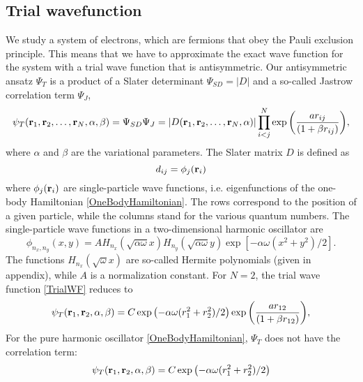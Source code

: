 \documentclass[english, a4paper]{article}
\begin{document}
\subsection{Trial wavefunction}
We study a system of electrons, which are fermions that obey the Pauli exclusion principle.
This means that we have to approximate the exact wave function for the system with a trial
wave function that is antisymmetric. Our antisymmetric ansatz $\Psi_T$ is a product of a 
Slater determinant $\Psi_{SD} = |D|$ and a so-called Jastrow correlation term $\Psi_J$,
\begin{equation}
   \psi_{T}({\bf r}_1,{\bf r}_2,\dots, {\bf r}_N, \alpha, \beta) = \Psi_{SD}\Psi_J = 
   |D({\bf r}_1,{\bf r}_2,\dots, {\bf r}_N, \alpha)|
   \prod_{i<j}^{N}\exp{\left(\frac{a r_{ij}}{(1+\beta r_{ij})}\right)}, 
   \label{TrialWF}
\end{equation}
where $\alpha$ and $\beta$ are the variational parameters.
The Slater matrix $D$ is defined as
\begin{equation}
 d_{ij} = \phi_j({\bf r}_i)
 \label{slaterMatrix}
\end{equation}
where $\phi_j({\bf r}_i)$ are single-particle wave functions, i.e. eigenfunctions of the one-body 
Hamiltonian \eqref{OneBodyHamiltonian}. The rows correspond to the position of a given particle, 
while the columns stand for the various quantum numbers.
The single-particle wave functions in a two-dimensional harmonic oscillator are
\begin{equation}
 \phi_{n_x,n_y}(x,y) = A H_{n_x}(\sqrt{\alpha\omega}x)H_{n_y}(\sqrt{\alpha\omega}y)\exp{[-\alpha\omega(x^2+y^2)/2]}.
\end{equation}
The functions $H_{n_x}(\sqrt{\omega}x)$ are so-called Hermite polynomials (given in appendix), while
$A$ is a normalization constant. 
For $N=2$, the trial wave function \eqref{TrialWF} reduces to
\begin{equation}
   \psi_{T}({\bf r}_1,{\bf r}_2, \alpha, \beta) = 
   C\exp{\left(-\alpha\omega(r_1^2+r_2^2)/2\right)}
   \exp{\left(\frac{ar_{12}}{(1+\beta r_{12})}\right)}, 
\label{trialWF2}
\end{equation}
For the pure harmonic oscillator \eqref{OneBodyHamiltonian}, $\Psi_T$ does not have the correlation term:
\begin{equation}
   \psi_{T}({\bf r}_1,{\bf r}_2, \alpha, \beta) = 
   C\exp{\left(-\alpha\omega(r_1^2+r_2^2)/2\right)}
\label{trialWFHarmOscillator}
\end{equation}
\end{document}
